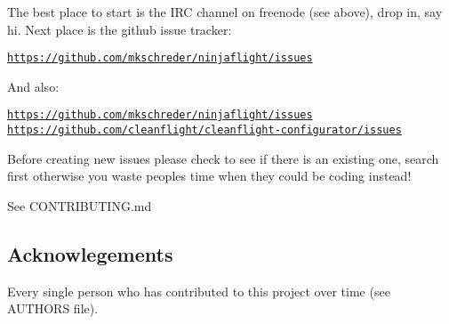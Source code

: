 The best place to start is the I\+R\+C channel on freenode (see above), drop in, say hi. Next place is the github issue tracker\+:

\href{https://github.com/mkschreder/ninjaflight/issues}{\tt https\+://github.\+com/mkschreder/ninjaflight/issues}

And also\+:

\href{https://github.com/mkschreder/ninjaflight/issues}{\tt https\+://github.\+com/mkschreder/ninjaflight/issues} \href{https://github.com/cleanflight/cleanflight-configurator/issues}{\tt https\+://github.\+com/cleanflight/cleanflight-\/configurator/issues}

Before creating new issues please check to see if there is an existing one, search first otherwise you waste peoples time when they could be coding instead!

See C\+O\+N\+T\+R\+I\+B\+U\+T\+I\+N\+G.md

\subsection*{Acknowlegements}

Every single person who has contributed to this project over time (see A\+U\+T\+H\+O\+R\+S file). 